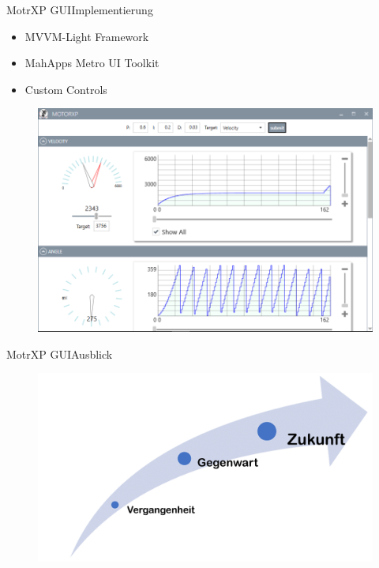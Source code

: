 		\begin{frame}{MotrXP GUI}{Implementierung}
		\begin{minipage}{0.5\textwidth}
			\begin{itemize}
				\item MVVM-Light Framework
				\item MahApps Metro UI Toolkit
				\item Custom Controls 
			\end{itemize}
		\end{minipage}
		\hfill
		\begin{minipage}{0.4\textwidth}
			\begin{figure}[h]
	  			\centering
	  				\includegraphics[width=\textwidth]{../gui/Bilder/GUIScreenshot2.png}
	  		\end{figure}
		\end{minipage}
	  		
		\end{frame}


		\begin{frame}{MotrXP GUI}{Ausblick}
\begin{figure}
	  			\centering
	  				\includegraphics[width=\textwidth]{../gui/Bilder/AusblickPfeil.png}
	  		\end{figure}
		\end{frame}